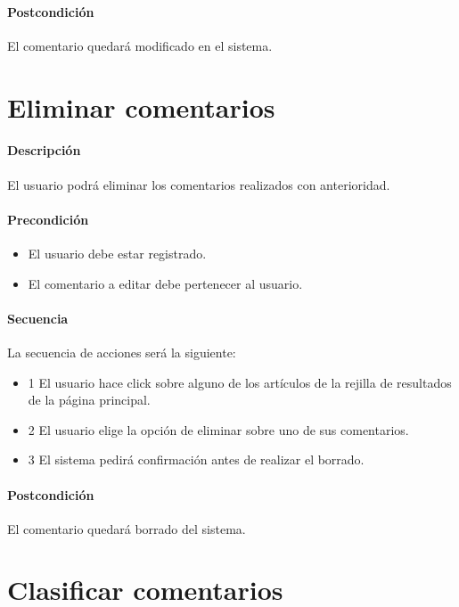 \paragraph{Postcondición} El comentario quedará modificado en el sistema.


\section{Eliminar comentarios}

\paragraph{Descripción} El usuario podrá eliminar los comentarios realizados con anterioridad.

\paragraph{Precondición} 
\begin{itemize}
	\item El usuario debe estar registrado.
	\item El comentario a editar debe pertenecer al usuario.
\end{itemize}

\paragraph{Secuencia} La secuencia de acciones será la siguiente:

\begin{itemize}
	\item 1 El usuario hace click sobre alguno de los artículos de la rejilla de resultados de la página principal.
	\item 2 El usuario elige la opción de eliminar sobre uno de sus comentarios.
	\item 3 El sistema pedirá confirmación antes de realizar el borrado.
\end{itemize}
	
\paragraph{Postcondición} El comentario quedará borrado del sistema.

\section{Clasificar comentarios}

